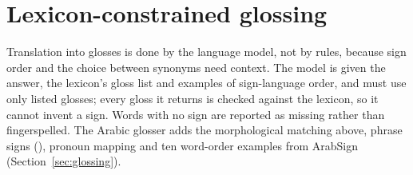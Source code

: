 \section{Lexicon-constrained glossing}
Translation into glosses is done by the language model, not by rules, because sign order and the choice between
synonyms need context. The model is given the answer, the lexicon's gloss list and examples of sign-language order, and
must use only listed glosses; every gloss it returns is checked against the lexicon, so it cannot invent a sign. Words
with no sign are reported as missing rather than fingerspelled. The Arabic glosser adds the morphological matching above,
phrase signs (), pronoun mapping and ten word-order examples from ArabSign \cite{arabsign}
(Section~\ref{sec:glossing}).
